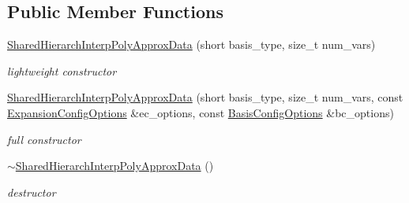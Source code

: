 \subsection*{Public Member Functions}
\begin{DoxyCompactItemize}
\item 
\hyperlink{classPecos_1_1SharedHierarchInterpPolyApproxData_aa3a9c9850f95d501536def228bf1a425}{Shared\+Hierarch\+Interp\+Poly\+Approx\+Data} (short basis\+\_\+type, size\+\_\+t num\+\_\+vars)\label{classPecos_1_1SharedHierarchInterpPolyApproxData_aa3a9c9850f95d501536def228bf1a425}

\begin{DoxyCompactList}\small\item\em lightweight constructor \end{DoxyCompactList}\item 
\hyperlink{classPecos_1_1SharedHierarchInterpPolyApproxData_a4018f977758d4f1938b45215956864a4}{Shared\+Hierarch\+Interp\+Poly\+Approx\+Data} (short basis\+\_\+type, size\+\_\+t num\+\_\+vars, const \hyperlink{classPecos_1_1ExpansionConfigOptions}{Expansion\+Config\+Options} \&ec\+\_\+options, const \hyperlink{classPecos_1_1BasisConfigOptions}{Basis\+Config\+Options} \&bc\+\_\+options)\label{classPecos_1_1SharedHierarchInterpPolyApproxData_a4018f977758d4f1938b45215956864a4}

\begin{DoxyCompactList}\small\item\em full constructor \end{DoxyCompactList}\item 
\hyperlink{classPecos_1_1SharedHierarchInterpPolyApproxData_a31c792613cec46c073f56ecfc7183f9f}{$\sim$\+Shared\+Hierarch\+Interp\+Poly\+Approx\+Data} ()\label{classPecos_1_1SharedHierarchInterpPolyApproxData_a31c792613cec46c073f56ecfc7183f9f}

\begin{DoxyCompactList}\small\item\em destructor \end{DoxyCompactList}\end{DoxyCompactItemize}
